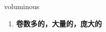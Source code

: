 
\begin{frame}
{\huge voluminous}
\begin{center}
\begin{enumerate}\Large
  \item \textbf{卷数多的，大量的，庞大的}
\end{enumerate}
\end{center}
\end{frame}
